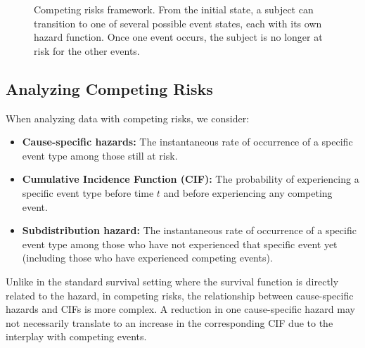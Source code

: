 \begin{figure}[htbp]
    \centering
    \caption{Competing risks framework. From the initial state, a subject can transition to one of several possible event states, each with its own hazard function. Once one event occurs, the subject is no longer at risk for the other events.}
    \label{fig:competing-risks}
\end{figure}

\subsection{Analyzing Competing Risks}
\label{subsec:analyzing-competing-risks}

When analyzing data with competing risks, we consider:

\begin{itemize}
    \item \textbf{Cause-specific hazards:} The instantaneous rate of occurrence of a specific event type among those still at risk.
    
    \item \textbf{Cumulative Incidence Function (CIF):} The probability of experiencing a specific event type before time $t$ and before experiencing any competing event.
    
    \item \textbf{Subdistribution hazard:} The instantaneous rate of occurrence of a specific event type among those who have not experienced that specific event yet (including those who have experienced competing events).
\end{itemize}

Unlike in the standard survival setting where the survival function is directly related to the hazard, in competing risks, the relationship between cause-specific hazards and CIFs is more complex. A reduction in one cause-specific hazard may not necessarily translate to an increase in the corresponding CIF due to the interplay with competing events.

